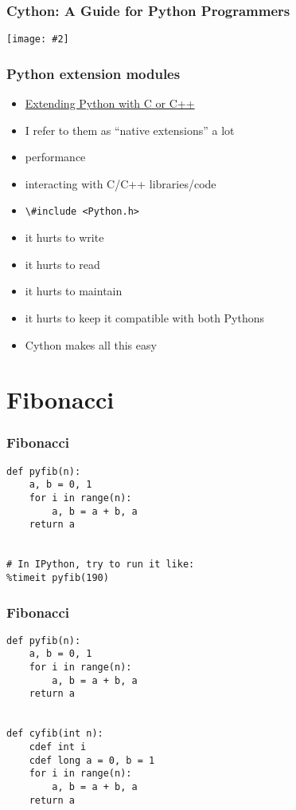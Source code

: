 \documentclass{beamer}
\newcommand*{\pic}[2][]{%
\centering\begin{adjustbox}{max size={\textwidth}{0.85\textheight}}
    \texttt{[image: \#2]}%
\end{adjustbox}
}
\begin{document}
\begin{frame}
  \frametitle{Cython: A Guide for Python Programmers}
    \pic{book.jpg}
\end{frame}

\begin{frame}
  \frametitle{Python extension modules}
    \begin{itemize}
      \item \href{https://docs.python.org/3/extending/extending.html}{Extending Python with C or C++}
      \item I refer to them as ``native extensions'' a lot
      \item performance
      \item interacting with C/C++ libraries/code
      \item \lstinline{\#include <Python.h>}
      \item it hurts to write
      \item it hurts to read
      \item it hurts to maintain
      \item it hurts to keep it compatible with both Pythons
      \item Cython makes all this easy
    \end{itemize}
\end{frame}

\section{Fibonacci}

\begin{frame}[fragile]
  \frametitle{Fibonacci}
    \begin{lstlisting}
def pyfib(n):
    a, b = 0, 1
    for i in range(n):
        a, b = a + b, a
    return a


# In IPython, try to run it like:
%timeit pyfib(190)
    \end{lstlisting}
\end{frame}

\begin{frame}[fragile]
  \frametitle{Fibonacci}
    \begin{lstlisting}
def pyfib(n):
    a, b = 0, 1
    for i in range(n):
        a, b = a + b, a
    return a


def cyfib(int n):
    cdef int i
    cdef long a = 0, b = 1
    for i in range(n):
        a, b = a + b, a
    return a
    \end{lstlisting}
\end{frame}
\end{document}
